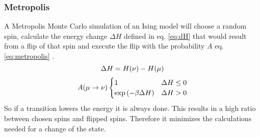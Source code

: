     \subsubsection{Metropolis}
        A Metropolis Monte Carlo\cite{Metropolis1953} simulation of an
        Ising model will choose a random spin, calculate the energy change
        \(\Delta H\) defined in eq. \eqref{eq:dH} that would result
        from a flip of that spin and execute the flip with the probability \(A\)
        eq. \eqref{eq:metropolis} \cite{NewmanBarkema1999} \cite{Katzgraber2011}.
        \begin{equation}
            \Delta H = H(\nu) - H(\mu)\\
            \label{eq:dH}
        \end{equation}
        \begin{equation}
            A(\mu \to \nu)
            \begin{cases}
                1                            & \Delta H \le 0 \\
                \exp{\ensuremath{\left(-\beta \Delta H\right)}} & \Delta H > 0
            \end{cases}
            \label{eq:metropolis}
        \end{equation}
        So if a transition lowers the energy it is always done. This
        results in a high ratio between chosen spins and flipped spins.
        Therefore it minimizes the calculations needed for a change of
        the state.

